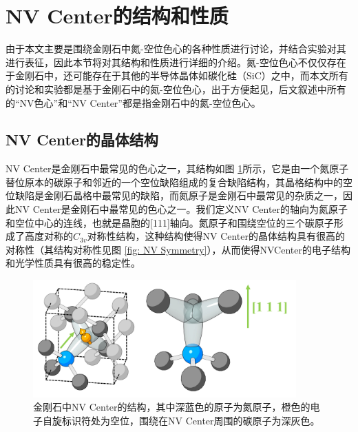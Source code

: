 \documentclass[type = bachelor]{whu-thesis}
\begin{document}
\section{NV Center的结构和性质}

由于本文主要是围绕金刚石中氮-空位色心的各种性质进行讨论，并结合实验对其进行表征，因此本节将对其结构和性质进行详细的介绍。氮-空位色心不仅仅存在于金刚石中，还可能存在于其他的半导体晶体如碳化硅（SiC）之中，而本文所有的讨论和实验都是基于金刚石中的氮-空位色心，出于方便起见，后文叙述中所有的“NV色心”和“NV Center”都是指金刚石中的氮-空位色心\cite{von2015identification, csore2017characterization}。

\subsection{NV Center的晶体结构}
NV Center是金刚石中最常见的色心之一，其结构如图 \ref{fig: NV Structure}所示，它是由一个氮原子替位原本的碳原子和邻近的一个空位缺陷组成的复合缺陷结构，其晶格结构中的空位缺陷是金刚石晶格中最常见的缺陷，而氮原子是金刚石中最常见的杂质之一，因此NV Center是金刚石中最常见的色心之一。我们定义NV Center的轴向为氮原子和空位中心的连线，也就是晶胞的[111]轴向。氮原子和围绕空位的三个碳原子形成了高度对称的$C_{3v}$对称性结构，这种结构使得NV Center的晶体结构具有很高的对称性（其结构对称性见图 \ref{fig: NV Symmetry}），从而使得NVCenter的电子结构和光学性质具有很高的稳定性。

\begin{figure}
  \centering
  \includegraphics[width=0.9\textwidth]{figures/Chapter 1/NV Structure.png}
  \caption[金刚石中NV Center的结构]{金刚石中NV Center的结构，其中深蓝色的原子为氮原子，橙色的电子自旋标识符处为空位，围绕在NV Center周围的碳原子为深灰色\cite{staudacher2015nuclear}。}
  \label{fig: NV Structure}
\end{figure}
\end{document}
